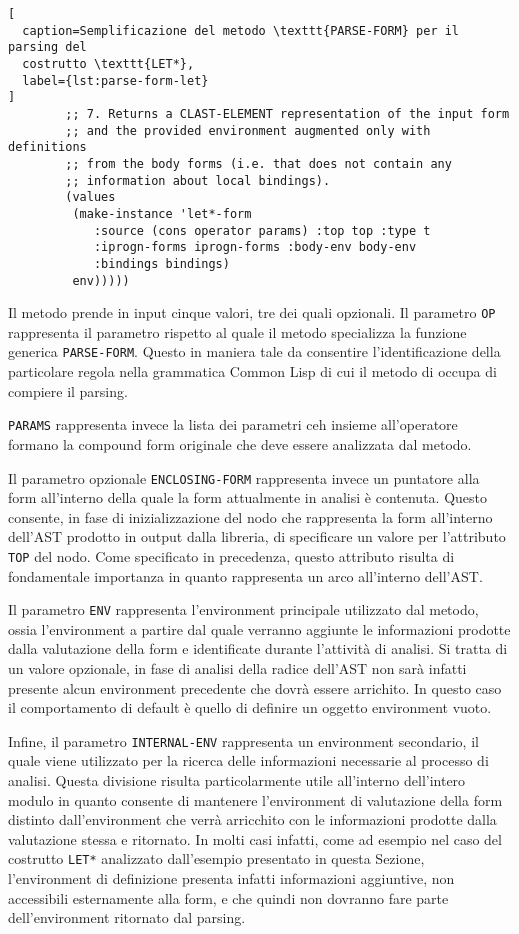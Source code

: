 \begin{lstlisting}[
  caption=Semplificazione del metodo \texttt{PARSE-FORM} per il parsing del
  costrutto \texttt{LET*},
  label={lst:parse-form-let}
]
        ;; 7. Returns a CLAST-ELEMENT representation of the input form
        ;; and the provided environment augmented only with definitions
        ;; from the body forms (i.e. that does not contain any
        ;; information about local bindings).
        (values
         (make-instance 'let*-form
            :source (cons operator params) :top top :type t
            :iprogn-forms iprogn-forms :body-env body-env
            :bindings bindings)
         env)))))

\end{lstlisting}

Il metodo prende in input cinque valori, tre dei quali opzionali. Il parametro
\texttt{OP} rappresenta il parametro rispetto al quale il metodo specializza
la funzione generica \texttt{PARSE-FORM}. Questo in maniera tale da consentire
l'identificazione della particolare regola nella grammatica Common Lisp di cui
il metodo di occupa di compiere il parsing.

\texttt{PARAMS} rappresenta invece la lista dei parametri ceh insieme
all'operatore formano la compound form originale che deve essere analizzata
dal metodo.

Il parametro opzionale \texttt{ENCLOSING-FORM} rappresenta invece un puntatore
alla form all'interno della quale la form attualmente in analisi è contenuta.
Questo consente, in fase di inizializzazione del nodo che rappresenta la form
all'interno dell'AST prodotto in output dalla libreria, di specificare un
valore per l'attributo \texttt{TOP} del nodo. Come specificato in precedenza,
questo attributo risulta di fondamentale importanza in quanto rappresenta un
arco all'interno dell'AST.

Il parametro \texttt{ENV} rappresenta l'environment principale utilizzato dal
metodo, ossia l'environment a partire dal quale verranno aggiunte le
informazioni prodotte dalla valutazione della form e identificate durante
l'attività di analisi. Si tratta di un valore opzionale, in fase di analisi
della radice dell'AST non sarà infatti presente alcun environment precedente
che dovrà essere arrichito. In questo caso il comportamento di default è
quello di definire un oggetto environment vuoto.

Infine, il parametro \texttt{INTERNAL-ENV} rappresenta un environment
secondario, il quale viene utilizzato per la ricerca delle informazioni
necessarie al processo di analisi. Questa divisione risulta particolarmente
utile all'interno dell'intero modulo in quanto consente di mantenere
l'environment di valutazione della form distinto dall'environment che verrà
arricchito con le informazioni prodotte dalla valutazione stessa e ritornato.
In molti casi infatti, come ad esempio nel caso del costrutto \texttt{LET*}
analizzato dall'esempio presentato in questa Sezione, l'environment di
definizione presenta infatti informazioni aggiuntive, non accessibili
esternamente alla form, e che quindi non dovranno fare parte dell'environment
ritornato dal parsing.

